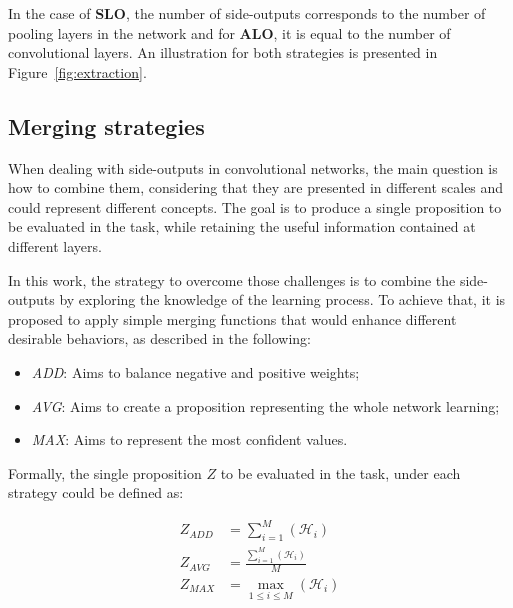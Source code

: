 
In the case of \textbf{SLO}, the number of side-outputs corresponds to the number of pooling layers in the network and for \textbf{ALO}, it is equal to the number of convolutional layers. An illustration for both strategies is presented in Figure~\ref{fig:extraction}.

\subsection{Merging strategies}
\label{ssec:mergin_strategies}

When dealing with side-outputs in convolutional networks, the main question is how to combine them, considering that they are presented in different scales and could represent different concepts. The goal is to produce a single proposition to be evaluated in the task, while retaining the useful information contained at different layers.

In this work, the strategy to overcome those challenges is to combine the side-outputs by exploring the knowledge of the learning process. To achieve that, it is proposed to apply simple merging functions that would enhance different desirable behaviors, as described in the following: 
\begin{itemize}
\item \textit{ADD}: Aims to balance negative and positive weights;
\item \textit{AVG}: Aims to create a proposition representing the whole network learning;  
\item \textit{MAX}: Aims to represent the most confident values. 
\end{itemize}  

Formally, the single proposition $Z$ to be evaluated in the task, under each strategy could be defined as:

\begin{align}
Z_{ADD} &= \sum_{i=1}^{M}(\mathcal{H}_i)\\
Z_{AVG} &= \frac{\sum_{i=1}^{M}(\mathcal{H}_i)}{M}\\
Z_{MAX} &= \max_{1 \leq i \leq M} (\mathcal{H}_i)
\end{align} 

